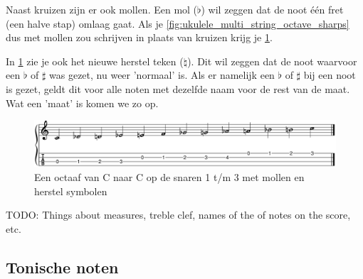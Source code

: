 Naast kruizen zijn er ook mollen. Een mol ($\flat$) wil zeggen dat de noot één fret (een halve stap) omlaag gaat. Als je \ref{fig:ukulele_multi_string_octave_sharps} dus met mollen zou schrijven in plaats van kruizen krijg je \ref{fig:ukulele_fretboard_filled_flats}.

In \ref{fig:ukulele_fretboard_filled_flats} zie je ook het nieuwe herstel teken ($\natural$). Dit wil zeggen dat de noot waarvoor een $\flat$ of $\sharp$ was gezet, nu weer 'normaal' is. Als er namelijk een $\flat$ of $\sharp$ bij een noot is gezet, geldt dit voor alle noten met dezelfde naam voor de rest van de maat. Wat een 'maat' is komen we zo op.

\begin{figure}[h]
    \centering
    \includegraphics[width=\textwidth]{../MuseScore/Ukulele/UkuleleChromaticNotesFlatsMultiString.png}
    \caption{Een octaaf van C naar C op de snaren 1 t/m 3 met mollen en herstel symbolen}
    \label{fig:ukulele_fretboard_filled_flats}
\end{figure}

TODO: Things about measures, treble clef, names of the of notes on the score, etc.

\newpage

\subsection{Tonische noten}

